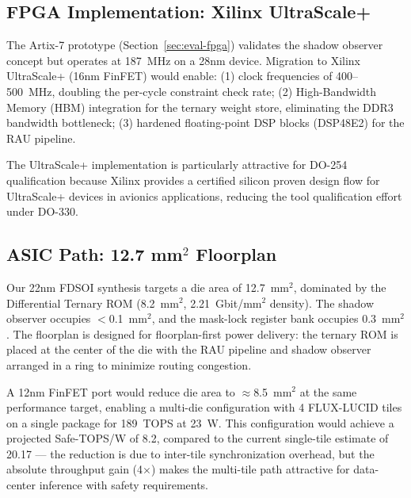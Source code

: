 \documentclass[conference]{IEEEtran}
\begin{document}
{%
\subsection{FPGA Implementation: Xilinx UltraScale+}
\label{sec:future-fpga}

The Artix-7 prototype (Section~\ref{sec:eval-fpga}) validates the
shadow observer concept but operates at 187~MHz on a 28nm device.
Migration to Xilinx UltraScale+ (16nm FinFET) would enable:
(1) clock frequencies of 400--500~MHz, doubling the per-cycle constraint
check rate;
(2) High-Bandwidth Memory (HBM) integration for the ternary weight store,
eliminating the DDR3 bandwidth bottleneck;
(3) hardened floating-point DSP blocks (DSP48E2) for the RAU pipeline.

The UltraScale+ implementation is particularly attractive for DO-254
qualification because Xilinx provides a certified silicon proven
design flow for UltraScale+ devices in avionics applications, reducing
the tool qualification effort under DO-330.

\subsection{ASIC Path: 12.7 mm$^2$ Floorplan}
\label{sec:future-asic}

Our 22nm FDSOI synthesis targets a die area of 12.7~mm$^2$, dominated
by the Differential Ternary ROM (8.2~mm$^2$, 2.21~Gbit/mm$^2$ density).
The shadow observer occupies $<$0.1~mm$^2$, and the mask-lock register
bank occupies 0.3~mm$^2$. The floorplan is designed for
floorplan-first power delivery: the ternary ROM is placed at the center
of the die with the RAU pipeline and shadow observer arranged in a
ring to minimize routing congestion.

A 12nm FinFET port would reduce die area to $\approx$8.5~mm$^2$
at the same performance target, enabling a multi-die configuration
with 4 FLUX-LUCID tiles on a single package for 189~TOPS at 23~W.
This configuration would achieve a projected Safe-TOPS/W of 8.2,
compared to the current single-tile estimate of 20.17 — the reduction
is due to inter-tile synchronization overhead, but the absolute
throughput gain (4$\times$) makes the multi-tile path attractive for
data-center inference with safety requirements.

}
\end{document}
